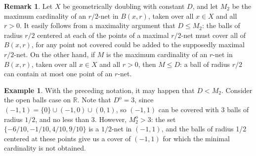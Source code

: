\documentclass[12pt]{amsart}
\theoremstyle{definition}
\newtheorem{remark}[theorem]{Remark}
\newtheorem{example}[theorem]{Example}
\theoremstyle{parrafo}
\newcommand{\R}{\mathbb{R}}
\begin{document}
	
	\begin{remark} \label{rnetbounds}
		Let $X$ be geometrically doubling with constant $D$, and let $M_{2}$ be the maximum cardinality of an $r/2$-net in $B(x, r)$,  taken over 
		all $x\in X$ and all  $r > 0$. It easily follows from a maximality argument that $D \le M_{2}$: the balls of radius $r/2$ centered at each of the points of a maximal $r/2$-net must cover all of $B(x,r)$, for any point not covered could be added to the supposedly maximal $r/2$-net. On the other hand, if $M$ is the maximum cardinality of an $r$-net in $B(x, r)$,  taken over 
		all $x\in X$ and all  $r > 0$, then $M \le D$: a ball of radius $r/2$ can contain at most one point of an $r$-net. 
\end{remark}
				
\begin{example} With the preceding notation, it may happen that $D < M_{2}$. Consider the open balls case on $\R$. Note that 
		$D^{\operatorname{o}} = 3$, since $(-1,1) = \{0\} \cup (-1,0) \cup (0,1)$, so $(-1,1)$ can be covered with 3 balls of radius $1/2$, and no less than 3. However, $M^{\operatorname{o}}_{2} >3$: the set $\{-6/10, -1/10, 4/10, 9/10\}$ is a $1/2$-net in $(-1,1)$, and the
		balls of radius 1/2 centered at these points 
		give us a cover of $(-1,1)$ for which the minimal cardinality is not obtained.
\end{example}

		
	
\end{document}
